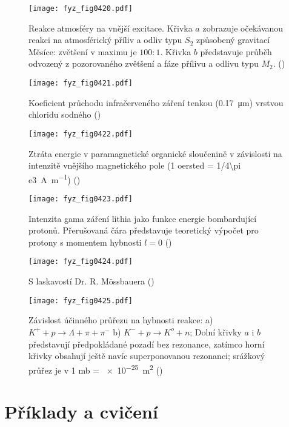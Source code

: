     \begin{figure}[ht!] %
      \centering
      \texttt{[image: fyz\_fig0420.pdf]}
      \caption{Reakce atmosféry na vnější excitace. Křivka \(a\) zobrazuje očekávanou reakci na
              atmosférický příliv a odliv typu \(S_2\) způsobený gravitací Měsíce: zvětšení v maximu
              je \(100:1\). Křivka \(b\) představuje průběh odvozený z pozorovaného zvětšení a fáze
              přílivu a odlivu typu \(M_2\). (\cite[s.~318]{Feynman01})}
      \label{fyz:fig0420}
    \end{figure}

    \begin{figure}[ht!] %
      \centering
      \texttt{[image: fyz\_fig0421.pdf]}
      \caption{Koeficient průchodu infračerveného záření tenkou (\qty{0.17}{\micro\m}) vrstvou
               chloridu sodného (\cite[s.~319]{Feynman01})}
      \label{fyz:fig0421}
    \end{figure}
  
    \begin{figure}[ht!] %
      \centering
      \texttt{[image: fyz\_fig0422.pdf]}
      \caption{Ztráta energie v paramagnetické organické sloučenině v závislosti na intenzitě
               vnějšího magnetického pole (1 oersted = \qty{1/4\pi e3}{\ampere\per\meter})
               (\cite[s.~320]{Feynman01})}
      \label{fyz:fig0422}
    \end{figure}
  
    \begin{figure}[ht!] %
      \centering
      \texttt{[image: fyz\_fig0423.pdf]}
      \caption{Intenzita gama záření lithia jako funkce energie bombardující protonů. Přerušovaná 
               čára představuje teoretický výpočet pro protony s momentem hybnosti \(l=0\)
               (\cite[s.~320]{Feynman01})}
      \label{fyz:fig0423}
    \end{figure}
  
    \begin{figure}[ht!] %
      \centering
      \texttt{[image: fyz\_fig0424.pdf]}
      \caption{S laskavostí Dr. R. M\"{o}ssbauera
               (\cite[s.~321]{Feynman01})}
      \label{fyz:fig0424}
    \end{figure}
  
    \begin{figure}[ht!] %
      \centering
      \texttt{[image: fyz\_fig0425.pdf]}
      \caption{Závislost účinného průřezu na hybnosti reakce: a) \(K^+ + p \rightarrow \Lambda + \pi
              + \pi^-\) b) \(K^- + p \rightarrow K^o + n\); Dolní křivky \(a\) i \(b\) představují
              předpokládané pozadí bez rezonance, zatímco horní křivky obsahují ještě navíc
              superponovanou rezonanci; srážkový průřez je v 1 mb =
              \qty{e-25}{\m\squared} (\cite[s.~321]{Feynman01})}
      \label{fyz:fig0425}
    \end{figure}

  \section{Příklady a cvičení}\label{fyz:IchapXXIIIsecV}
